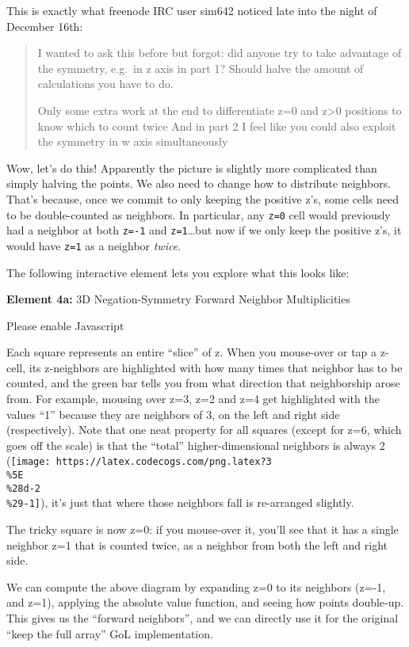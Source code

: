 \documentclass[]{article}
\begin{document}
This is exactly what freenode IRC user sim642 noticed late into the night of
December 16th:

\begin{quote}
I wanted to ask this before but forgot: did anyone try to take advantage of the
symmetry, e.g.~in z axis in part 1? Should halve the amount of calculations you
have to do.

Only some extra work at the end to differentiate z=0 and z\textgreater0
positions to know which to count twice And in part 2 I feel like you could also
exploit the symmetry in w axis simultaneously
\end{quote}

Wow, let's do this! Apparently the picture is slightly more complicated than
simply halving the points. We also need to change how to distribute neighbors.
That's because, once we commit to only keeping the positive z's, some cells need
to be double-counted as neighbors. In particular, any \texttt{z=0} cell would
previously had a neighbor at both \texttt{z=-1} and \texttt{z=1}\ldots but now
if we only keep the positive z's, it would have \texttt{z=1} as a neighbor
\emph{twice}.

The following interactive element lets you explore what this looks like:

\leavevmode\hypertarget{golSyms3DForward}{}%
\textbf{Element 4a:} 3D Negation-Symmetry Forward Neighbor Multiplicities

\leavevmode\hypertarget{golSyms3DForwardCont}{}%
Please enable Javascript

Each square represents an entire ``slice'' of z. When you mouse-over or tap a
z-cell, its z-neighbors are highlighted with how many times that neighbor has to
be counted, and the green bar tells you from what direction that neighborship
arose from. For example, mousing over z=3, z=2 and z=4 get highlighted with the
values ``1'' because they are neighbors of 3, on the left and right side
(respectively). Note that one neat property for all squares (except for z=6,
which goes off the scale) is that the ``total'' higher-dimensional neighbors is
always 2
(\texttt{[image: https://latex.codecogs.com/png.latex?3\\\%5E\\\%28d-2\\\%29-1]}),
it's just that where those neighbors fall is re-arranged slightly.

The tricky square is now z=0: if you mouse-over it, you'll see that it has a
single neighbor z=1 that is counted twice, as a neighbor from both the left and
right side.

We can compute the above diagram by expanding z=0 to its neighbors (z=-1, and
z=1), applying the absolute value function, and seeing how points double-up.
This gives us the ``forward neighbors'', and we can directly use it for the
original ``keep the full array'' GoL implementation.
\end{document}
